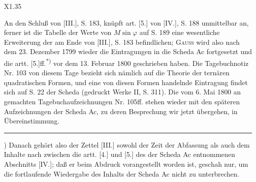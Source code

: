 \par\smallskip\noindent X1.\hfill35
\clearpage
{}
\par\indent An den Schluß von [III.], S. 183, knüpft art. [5.] von [IV.], S. 188 unmittelbar an, ferner ist die Tabelle der Werte von $M\sin\varphi$ auf S. 189 eine wesentliche Erweiterung der am Ende von [III.], S. 183 befindlichen; \textsc{Gauss} wird also nach dem 23. Dezember 1799 wieder die Eintragungen in die Scheda Ac fortgesetzt und die artt. [5.]ff.\textsuperscript{*)} vor dem 13. Februar 1800 geschrieben haben. Die Tagebuchnotiz Nr. 103 von diesem Tage bezieht sich nämlich auf die Theorie der ternären quadratischen Formen, und eine von diesen Formen handelnde Eintragung findet sich auf S. 22 der Scheda (gedruckt Werke II, S. 311). Die vom 6. Mai 1800 an gemachten Tagebuchaufzeichnungen Nr. 105ff. stehen wieder mit den späteren Aufzeichnungen der Scheda Ac, zu deren Besprechung wir jetzt übergehen, in Übereinstimmung.
\par\smallskip\noindent\rule{.25\linewidth}{.4pt}\par
{\small\par\indent *) Danach gehört also der Zettel [III.] sowohl der Zeit der Abfassung als auch dem Inhalte nach zwischen die artt. [4.] und [5.] des der Scheda Ac entnommenen Abschnitts [IV.]; daß er beim Abdruck vorangestellt worden ist, geschah nur, um die fortlaufende Wiedergabe des Inhalts der Scheda Ac nicht zu unterbrechen.\par}
\clearpage
\endgroup


